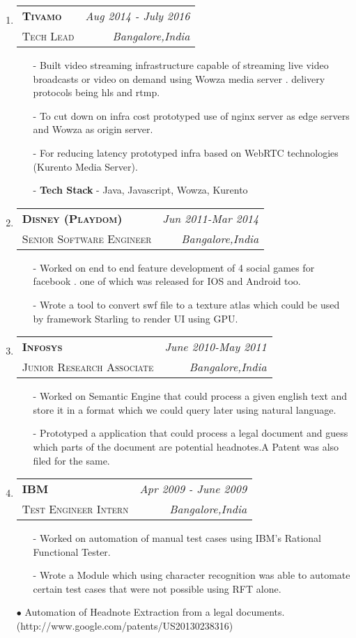 \documentclass[letterpaper,10pt]{article}
\makeatletter
\newlength{\outerbordwidth}
\newcommand{\resheading}[1]{\vspace{2pt}
  \parbox{\textwidth}{\setlength{\FrameSep}{\outerbordwidth}
    \begin{shaded}
\setlength{\fboxsep}{0pt}\framebox[\textwidth][l]{\setlength{\fboxsep}{4pt}\fcolorbox{shadecolorB}{shadecolorB}{\textbf{\sffamily{\mbox{~}\makebox[6.762in][l]{\large\scshape #1} \vphantom{p\^{E}}}}}}
    \end{shaded}
  }\vspace{-8pt}
}
\newcommand{\workitem}[4]{
\begin{tabular*}{6.5in}{l @{\extracolsep{\fill}} r}
		\textbf{\textsc{#1}} & \textit{#2} \\
		\textsc{#3} & \textit{#4} \\
\end{tabular*}\vspace{-4pt}}
\newcommand{\workitemfull}[4]{
	\item[$\bullet$]\workitem{#1}{#2}{#3}{#4}
}
\makeatother
\begin{document}
\begin{enumerate}
	\workitemfull{Tivamo}{Aug 2014 - July 2016}{Tech Lead}{Bangalore,India}
	\begin{enumerate}
		\item[-] Built video streaming infrastructure capable of streaming live video broadcasts or video on demand using Wowza media server . delivery protocols being hls and rtmp.
		\item[-] To cut down on infra cost prototyped use of nginx server as edge servers and Wowza as origin server. 
		\item[-] For reducing latency prototyped infra based on WebRTC technologies (Kurento Media Server). 
		\item[-] \textbf{Tech Stack} - Java, Javascript, Wowza, Kurento
	\end{enumerate}	
		
	\workitemfull{Disney (Playdom) }{Jun 2011-Mar 2014}{Senior Software Engineer}			{Bangalore,India}
	\begin{enumerate}
		\item[-] Worked on end to end feature development of 4 social games for facebook . one of 		which was released for IOS and Android too.
		\item[-] Wrote a tool to convert swf file to a texture atlas which could be used by framework 			Starling to render UI using GPU.
	\end{enumerate}	
	
	\workitemfull{Infosys}{June 2010-May 2011}{Junior Research Associate}{Bangalore,India}
	\begin{enumerate}
		\item[-] Worked on Semantic Engine that could process a given english text and store it in a 		format which we could query later using natural language.
		\item[-] Prototyped a application that could process a legal document and guess which parts 		of the document are potential headnotes.A Patent was also filed for the same.
	\end{enumerate}
	
	\workitemfull{IBM}{Apr 2009 - June 2009}{Test Engineer Intern}{Bangalore,India}
	\begin{enumerate}
		\item[-] Worked on automation of manual test cases using IBM's Rational Functional Tester.
		\item[-] Wrote a Module which using character recognition was able to automate 	certain test cases that were not possible using RFT alone.
	\end{enumerate}
\end{enumerate}


\begin{minipage}{\textwidth}
\resheading{Patents}
	\begin{enumerate}
		\item[$\bullet$]Automation of Headnote Extraction from a legal documents.\\ (http://www.google.com/patents/US20130238316)
	\end{enumerate}

\end{minipage}
\end{document}
